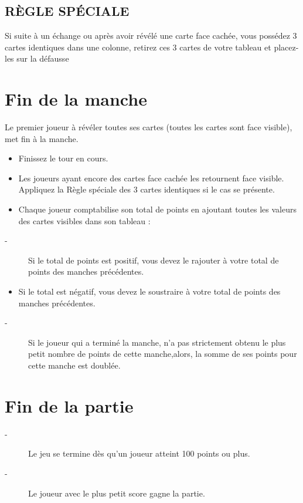 \documentclass{article}%
\begin{document}
%
\subsection{ RÈGLE SPÉCIALE
}%
\label{subsec:RGLESPCIALE}%
Si suite à un échange ou après avoir révélé une carte face cachée, vous possédez 3 cartes identiques dans une colonne, retirez ces 3 cartes de votre tableau et placez{-}les sur la défausse


%
\section{ Fin de la manche
}%
\label{sec:Findelamanche}%
Le premier joueur à révéler toutes ses cartes (toutes les cartes sont face visible), met fin à la manche.
%
\begin{itemize}%
\item%
%
 Finissez le tour en cours.
%
\item%
%
 Les joueurs ayant encore des cartes face cachée les retournent face visible. Appliquez la Règle spéciale des 3 cartes identiques si le cas se présente.
%
\item%
%
 Chaque joueur comptabilise son total de points en ajoutant toutes les valeurs des cartes visibles dans son tableau :
%
\end{itemize}%
\begin{description}%
\item[{-} ]%
%
Si le total de points est positif, vous devez le rajouter à votre total de points des manches précédentes.
%
\end{description}%
\begin{itemize}%
\item%
%
 Si le total est négatif, vous devez le soustraire à votre total de points des manches précédentes.
%
\end{itemize}%
\begin{description}%
\item[{-} ]%
%
Si le joueur qui a terminé la manche, n’a pas strictement obtenu le plus petit nombre de points de cette manche,alors, la somme de ses points pour cette manche est doublée.
%
\end{description}

%
\section{ Fin de la partie
}%
\label{sec:Findelapartie}%
\begin{description}%
\item[{-} ]%
%
 Le jeu se termine dès qu’un joueur atteint 100 points ou plus.
%
\item[{-} ]%
%
 Le joueur avec le plus petit score gagne la partie.%
\end{description}

%
\end{document}
